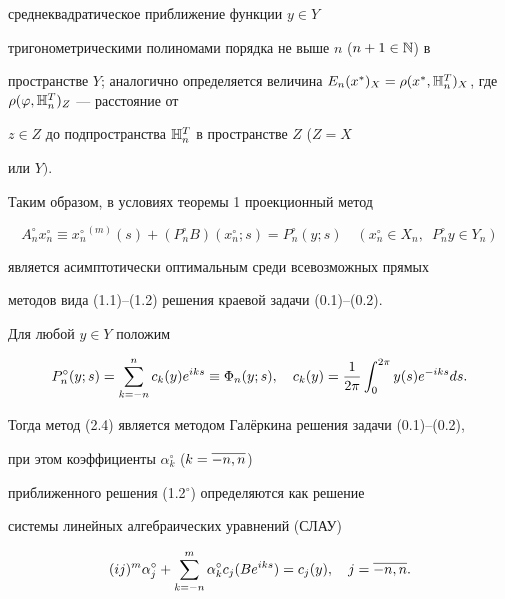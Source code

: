 среднеквадратическое приближение функции $y\in Y$


тригонометрическими полиномами порядка не выше $n$ ($n+1\in \Bbb {N}$) в


пространстве $Y$; аналогично определяется величина $E_n(x^*)_X =


\rho(x^*,\bH_n^T)_X$, где $\rho(\vp,\bH_n^T)_Z$ --- расстояние от


$z \in Z$ до подпространства $\Bbb {H}_n^T$ в пространстве $Z$ ($Z = X$


или $Y)$.





Таким образом, в условиях теоремы 1 проекционный метод


\begin{equation}


A_n^\circ x_n^\circ \equiv {x_n^\circ}^{(m)}(s) + (P_n^\circ


B)(x_n^\circ;s) = P_n^\circ(y;s)\quad (x_n^\circ\in X_n,\ \;


P_n^\circ y \in Y_n)


\end{equation}


является асимптотически оптимальным среди всевозможных прямых


методов вида (1.1)--(1.2) решения краевой задачи (0.1)--(0.2).





Для любой $y\in Y$ положим


\begin{equation}


P_n^\circ(y;s) = \suml_{k=-n}^nc_k(y)e^{iks} \equiv


\Phi_n(y;s),\quad c_k(y) = \frac{1}{2\pi}\int_0^{2\pi}y(s)e^{-


iks}ds.


\end{equation}


Тогда метод (2.4) является методом Гал\"еркина решения задачи (0.1)--(0.2), 


при этом коэффициенты $\alpha_k^\circ$ ($k=\overline{-n,n}$)


приближенного решения (1.2$^\circ$) определяются как решение


системы линейных алгебраических уравнений (СЛАУ)


\begin{equation}


(ij)^m\alpha_j^\circ + \suml_{k=-n}^m\alpha_k^\circ c_j (Be^{iks})


=c_j(y),\quad j=\ol{-n,n}.


\end{equation}


